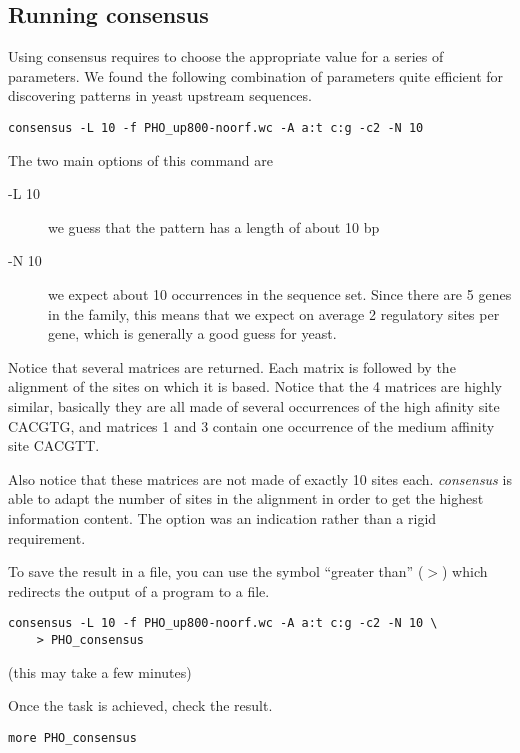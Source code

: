 \subsection{Running consensus}

Using consensus requires to choose the appropriate value for a series
of parameters. We found the following combination of parameters quite
efficient for discovering patterns in yeast upstream sequences.

{\color{Blue} \begin{footnotesize} 
\begin{verbatim}
consensus -L 10 -f PHO_up800-noorf.wc -A a:t c:g -c2 -N 10
\end{verbatim} \end{footnotesize}
}


The two main options of this command are 

\begin{description}
\item[-L 10] we guess that the pattern has a length of about 10 bp

\item[-N 10] we expect about 10 occurrences in the sequence set. Since
there are 5 genes in the family, this means that we expect on average
2 regulatory sites per gene, which is generally a good guess for
yeast.

\end{description}

Notice that several matrices are returned. Each matrix is followed by
the alignment of the sites on which it is based. Notice that the 4
matrices are highly similar, basically they are all made of several
occurrences of the high afinity site CACGTG, and matrices 1 and 3
contain one occurrence of the medium affinity site CACGTT. 

Also notice that these matrices are not made of exactly 10 sites
each. \textit{consensus} is able to adapt the number of sites in the
alignment in order to get the highest information content. The option
 was an indication rather than a rigid requirement.

To save the result in a file, you can use the symbol ``greater than''
($>$) which redirects the output of a program to a file.

{\color{Blue} \begin{footnotesize} 
\begin{verbatim}
consensus -L 10 -f PHO_up800-noorf.wc -A a:t c:g -c2 -N 10 \
    > PHO_consensus
\end{verbatim} \end{footnotesize}
}


(this may take a few minutes)

Once the task is achieved, check the result.

{\color{Blue} \begin{footnotesize} 
\begin{verbatim}
more PHO_consensus
\end{verbatim} \end{footnotesize}
}

